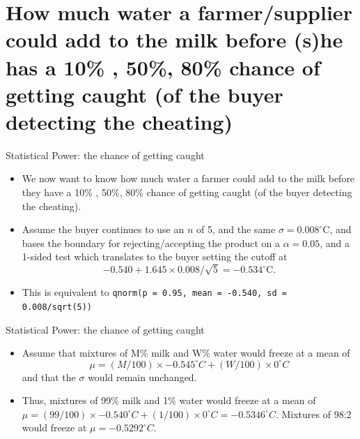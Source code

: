 \documentclass{beamer}\usepackage[]{graphicx}\usepackage[]{color}
\begin{document}
\section{How much water a farmer/supplier could add to the milk before (s)he has a 10\% , 50\%, 80\%
	chance of getting caught (of the buyer detecting the cheating)}

\begin{frame}{Statistical Power: the chance of getting caught}
\begin{itemize}
	\setlength\itemsep{1em}
	\item We now want to know how much water a farmer could add to the milk before they have a 10\% , 50\%, 80\% chance of getting caught (of the buyer detecting the cheating). 
	\item Assume the buyer continues to use an $n$ of 5, and the same $\sigma =0.008^{\circ}$C, and  bases the boundary for rejecting/accepting the product on a $\alpha = 0.05$, and a 1-sided test which translates to the buyer setting the cutoff at $$-0.540 + 1.645 \times 0.008/\sqrt{5}  = -0.534^{\circ}\textrm{C}.$$
	\item This is equivalent to \texttt{qnorm(p = 0.95, mean = -0.540, sd = 0.008/sqrt(5))}
\end{itemize}
\end{frame}



\begin{frame}{Statistical Power: the chance of getting caught}
\small
\begin{itemize}
	\setlength\itemsep{1em}
	\item Assume that  mixtures of M\% milk and W\% water  would freeze at a mean of $$\mu =  (M/100) \times -0.545^{\circ}C + (W/100) \times 0 ^{\circ}C$$ and that the $\sigma$ would remain unchanged. 
	\item Thus, mixtures of 99\% milk and 1\% water  would freeze at a mean of $\mu =  (99/100) \times -0.540^{\circ}C + (1/100) \times 0 ^{\circ}C = -0.5346 ^{\circ} C.$ Mixtures of 98:2  would freeze at $\mu =  -0.5292^{\circ}C.$  
\end{itemize}
\end{frame}
\end{document}
